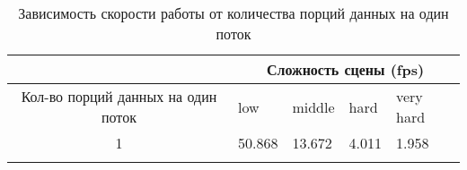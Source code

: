 \begin{center}
\begin{longtable}{|c|p{2cm}|p{2cm}|p{2cm}|p{2cm}|}
\hline & \multicolumn{4}{c|}{Сложность сцены (fps)} \\ 
\hline Кол-во порций данных на один поток & low & middle & hard &  very hard\\ 
\hline 1 &  50.868 & 13.672 & 4.011 & 1.958 \\ 
\hline
\caption{Зависимость скорости работы от количества порций данных на один поток}\label{tab:performance_gs}\end{longtable}
\end{center}

